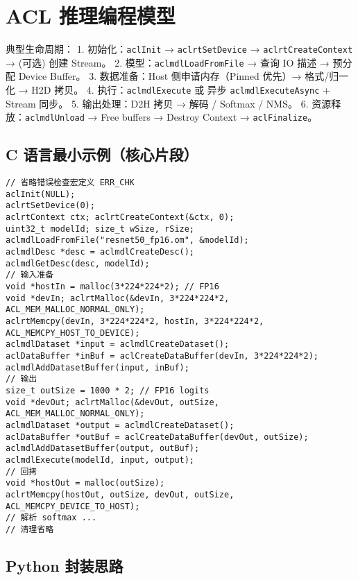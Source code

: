 \section{ACL
推理编程模型}\label{acl-ux63a8ux7406ux7f16ux7a0bux6a21ux578b}

典型生命周期： 1. 初始化：\passthrough{\lstinline!aclInit!} →
\passthrough{\lstinline!aclrtSetDevice!} →
\passthrough{\lstinline!aclrtCreateContext!} → (可选) 创建 Stream。 2.
模型：\passthrough{\lstinline!aclmdlLoadFromFile!} → 查询 IO 描述 →
预分配 Device Buffer。 3. 数据准备：Host 侧申请内存（Pinned 优先）→
格式/归一化 → H2D 拷贝。 4.
执行：\passthrough{\lstinline!aclmdlExecute!} 或 异步
\passthrough{\lstinline!aclmdlExecuteAsync!} + Stream 同步。 5.
输出处理：D2H 拷贝 → 解码 / Softmax / NMS。 6.
资源释放：\passthrough{\lstinline!aclmdlUnload!} → Free buffers →
Destroy Context → \passthrough{\lstinline!aclFinalize!}。

\subsection{C
语言最小示例（核心片段）}\label{c-ux8bedux8a00ux6700ux5c0fux793aux4f8bux6838ux5fc3ux7247ux6bb5}

\begin{lstlisting}
// 省略错误检查宏定义 ERR_CHK
aclInit(NULL);
aclrtSetDevice(0);
aclrtContext ctx; aclrtCreateContext(&ctx, 0);
uint32_t modelId; size_t wSize, rSize;
aclmdlLoadFromFile("resnet50_fp16.om", &modelId);
aclmdlDesc *desc = aclmdlCreateDesc();
aclmdlGetDesc(desc, modelId);
// 输入准备
void *hostIn = malloc(3*224*224*2); // FP16
void *devIn; aclrtMalloc(&devIn, 3*224*224*2, ACL_MEM_MALLOC_NORMAL_ONLY);
aclrtMemcpy(devIn, 3*224*224*2, hostIn, 3*224*224*2, ACL_MEMCPY_HOST_TO_DEVICE);
aclmdlDataset *input = aclmdlCreateDataset();
aclDataBuffer *inBuf = aclCreateDataBuffer(devIn, 3*224*224*2);
aclmdlAddDatasetBuffer(input, inBuf);
// 输出
size_t outSize = 1000 * 2; // FP16 logits
void *devOut; aclrtMalloc(&devOut, outSize, ACL_MEM_MALLOC_NORMAL_ONLY);
aclmdlDataset *output = aclmdlCreateDataset();
aclDataBuffer *outBuf = aclCreateDataBuffer(devOut, outSize);
aclmdlAddDatasetBuffer(output, outBuf);
aclmdlExecute(modelId, input, output);
// 回拷
void *hostOut = malloc(outSize);
aclrtMemcpy(hostOut, outSize, devOut, outSize, ACL_MEMCPY_DEVICE_TO_HOST);
// 解析 softmax ...
// 清理省略
\end{lstlisting}

\subsection{Python 封装思路}\label{python-ux5c01ux88c5ux601dux8def}

